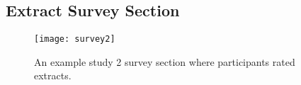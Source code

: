 \begin{appendices}
    \chapter{Extract Survey Section\label{app:extract-survey-section}}
      \begin{figure}[h]
        \caption{An example study 2 survey section where participants rated extracts.}
        \centering
        \texttt{[image: survey2]}
      \end{figure}

\end{appendices}
